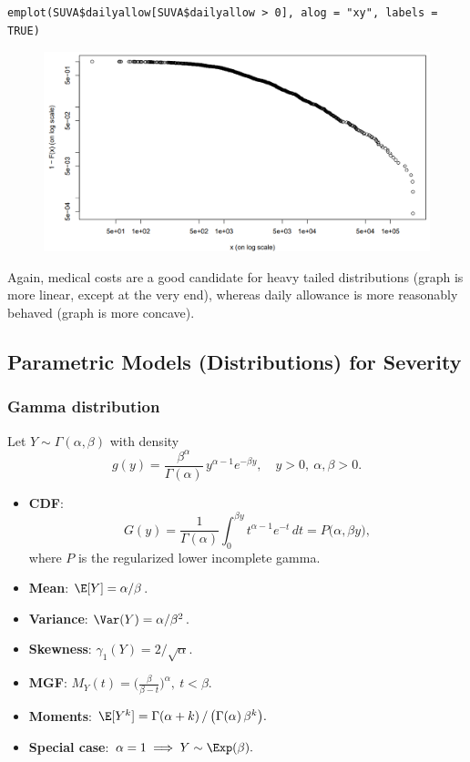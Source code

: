 \documentclass[11pt]{article}
\newcommand{\noi}{\noindent}
\begin{document}
\begin{lstlisting}
emplot(SUVA$dailyallow[SUVA$dailyallow > 0], alog = "xy", labels = TRUE)
\end{lstlisting}
\begin{figure}[H]
    \centering
    \includegraphics[width=0.7\linewidth]{SUVA - Log-Log - Daily Allow.png}
\end{figure}

\noi Again, medical costs are a good candidate for heavy tailed distributions
(graph is more linear, except at the very end), whereas daily allowance is
more reasonably behaved (graph is more concave).

\subsection{Parametric Models (Distributions) for Severity}
\subsubsection{Gamma distribution}
\noi Let \(Y\sim\Gamma(\alpha,\beta)\) with density
\[
g(y)=\frac{\beta^\alpha}{\Gamma(\alpha)}\,y^{\alpha-1}e^{-\beta y}, 
\quad y>0,\ \alpha,\beta>0.
\]
\begin{itemize}
  \item \textbf{CDF}: 
  \[
    G(y)=\frac{1}{\Gamma(\alpha)}\int_{0}^{\beta y}t^{\alpha-1}e^{-t}\,dt
    =P\bigl(\alpha,\beta y\bigr),
  \]
  where \(P\) is the regularized lower incomplete gamma.
  \item \textbf{Mean}: \(\E[Y]=\alpha/\beta\).
  \item \textbf{Variance}: \(\Var(Y)=\alpha/\beta^2\).
  \item \textbf{Skewness}: \(\gamma_1(Y)=2/\sqrt{\alpha}.\)
  \item \textbf{MGF}: \(M_Y(t)=\bigl(\tfrac{\beta}{\beta-t}\bigr)^{\alpha},\ t<\beta.\)
  \item \textbf{Moments}: \(\E[Y^k]=\Gamma(\alpha+k)\,/\,\bigl(\Gamma(\alpha)\,\beta^k\bigr).\)
  \item \textbf{Special case}: \(\alpha=1\implies Y\sim\Exp(\beta).\)
\end{itemize}
\end{document}
